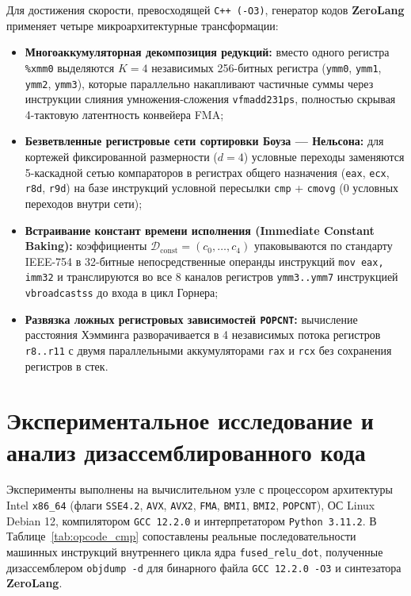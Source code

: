 \documentclass[11pt,a4paper]{article}
\begin{document}
Для достижения скорости, превосходящей \texttt{C++ (-O3)}, генератор кодов \textbf{ZeroLang} применяет четыре микроархитектурные трансформации:
\begin{itemize}
\setlength{\itemsep}{2pt}\setlength{\parskip}{0pt}
    \item \textbf{Многоаккумуляторная декомпозиция редукций:} вместо одного регистра \texttt{\%xmm0} выделяются $K=4$ независимых 256-битных регистра (\texttt{ymm0}, \texttt{ymm1}, \texttt{ymm2}, \texttt{ymm3}), которые параллельно накапливают частичные суммы через инструкции слияния умножения-сложения \texttt{vfmadd231ps}, полностью скрывая 4-тактовую латентность конвейера FMA;
    \item \textbf{Безветвленные регистровые сети сортировки Боуза — Нельсона:} для кортежей фиксированной размерности ($d=4$) условные переходы заменяются 5-каскадной сетью компараторов в регистрах общего назначения (\texttt{eax}, \texttt{ecx}, \texttt{r8d}, \texttt{r9d}) на базе инструкций условной пересылки \texttt{cmp} + \texttt{cmovg} (0 условных переходов внутри сети);
    \item \textbf{Встраивание констант времени исполнения (Immediate Constant Baking):} коэффициенты $\mathcal{D}_{\text{const}} = (c_0, \dots, c_4)$ упаковываются по стандарту IEEE-754 в 32-битные непосредственные операнды инструкций \texttt{mov eax, imm32} и транслируются во все 8 каналов регистров \texttt{ymm3..ymm7} инструкцией \texttt{vbroadcastss} до входа в цикл Горнера;
    \item \textbf{Развязка ложных регистровых зависимостей \texttt{POPCNT}:} вычисление расстояния Хэмминга разворачивается в 4 независимых потока регистров \texttt{r8..r11} с двумя параллельными аккумуляторами \texttt{rax} и \texttt{rcx} без сохранения регистров в стек.
\end{itemize}

\section{Экспериментальное исследование и анализ дизассемблированного кода}

Эксперименты выполнены на вычислительном узле с процессором архитектуры Intel \texttt{x86\_64} (флаги \texttt{SSE4.2}, \texttt{AVX}, \texttt{AVX2}, \texttt{FMA}, \texttt{BMI1}, \texttt{BMI2}, \texttt{POPCNT}), ОС Linux Debian 12, компилятором \texttt{GCC 12.2.0} и интерпретатором \texttt{Python 3.11.2}. В Таблице~\ref{tab:opcode_cmp} сопоставлены реальные последовательности машинных инструкций внутреннего цикла ядра \texttt{fused\_relu\_dot}, полученные дизассемблером \texttt{objdump -d} для бинарного файла \texttt{GCC 12.2.0 -O3} и синтезатора \textbf{ZeroLang}.
\end{document}
